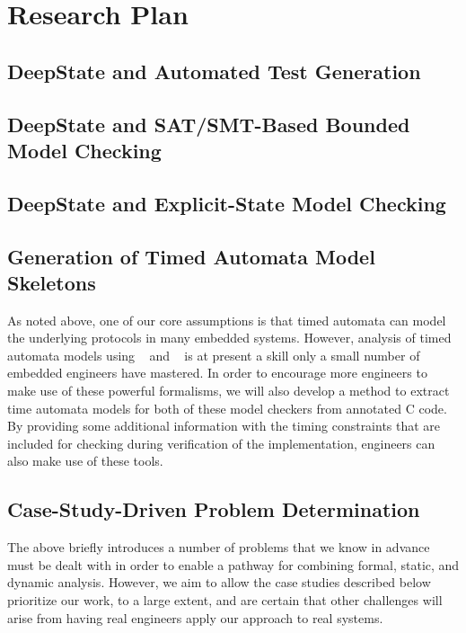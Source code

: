 \section{Research Plan}

%

\subsection{DeepState and Automated Test Generation}
\label{sec:framac2deepstate}


\subsection{DeepState and SAT/SMT-Based Bounded Model Checking}


\subsection{DeepState and Explicit-State Model Checking}


\subsection{Generation of Timed Automata Model Skeletons}
As noted above, one of our core assumptions is that timed automata can
model the underlying protocols in many embedded systems.  However,
analysis of timed automata models using \uppaal~\cite{uppaal} and
\prism~\cite{KNP2011:CAV} is at present a skill only a small number of
embedded engineers have mastered.  In order to encourage more
engineers to make use of these powerful formalisms, we will also
develop a method to extract time automata models for both of these
model checkers from annotated C code.  By providing some additional
information with the timing constraints that are included for
checking during verification of the implementation, engineers can also
make use of these tools.

\subsection{Case-Study-Driven Problem Determination}

The above briefly introduces a number of problems that we know in advance must
be dealt with in order to enable a pathway for combining formal,
static, and dynamic analysis.    However, we aim to allow the case
studies described below prioritize our work, to a large extent, and
are certain that other challenges will arise from having real
engineers apply our approach to real systems.


